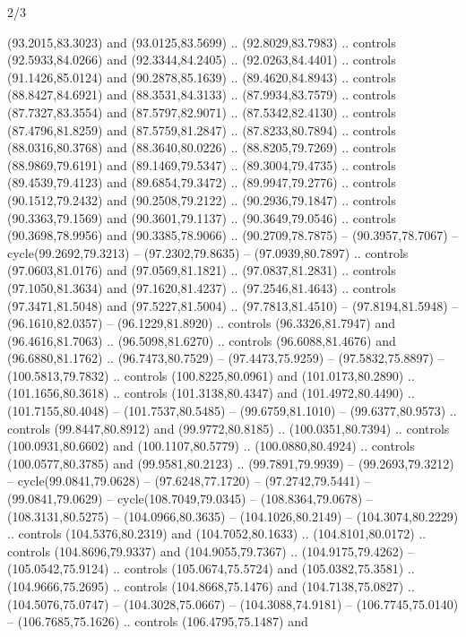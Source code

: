 \begin{flagdescription}{2/3}
\begin{scope}[scale=0.00214\flagwidth,yshift=164.5mm]
\begin{scope}[y=-0.8pt, x=0.8pt, inner sep=0pt, outer sep=0pt]
\begin{scope}[fill=black]
  (93.2015,83.3023) and (93.0125,83.5699) .. (92.8029,83.7983) .. controls
  (92.5933,84.0266) and (92.3344,84.2405) .. (92.0263,84.4401) .. controls
  (91.1426,85.0124) and (90.2878,85.1639) .. (89.4620,84.8943) .. controls
  (88.8427,84.6921) and (88.3531,84.3133) .. (87.9934,83.7579) .. controls
  (87.7327,83.3554) and (87.5797,82.9071) .. (87.5342,82.4130) .. controls
  (87.4796,81.8259) and (87.5759,81.2847) .. (87.8233,80.7894) .. controls
  (88.0316,80.3768) and (88.3640,80.0226) .. (88.8205,79.7269) .. controls
  (88.9869,79.6191) and (89.1469,79.5347) .. (89.3004,79.4735) .. controls
  (89.4539,79.4123) and (89.6854,79.3472) .. (89.9947,79.2776) .. controls
  (90.1512,79.2432) and (90.2508,79.2122) .. (90.2936,79.1847) .. controls
  (90.3363,79.1569) and (90.3601,79.1137) .. (90.3649,79.0546) .. controls
  (90.3698,78.9956) and (90.3385,78.9066) .. (90.2709,78.7875) --
  (90.3957,78.7067) -- cycle(99.2692,79.3213) -- (97.2302,79.8635) --
  (97.0939,80.7897) .. controls (97.0603,81.0176) and (97.0569,81.1821) ..
  (97.0837,81.2831) .. controls (97.1050,81.3634) and (97.1620,81.4237) ..
  (97.2546,81.4643) .. controls (97.3471,81.5048) and (97.5227,81.5004) ..
  (97.7813,81.4510) -- (97.8194,81.5948) -- (96.1610,82.0357) --
  (96.1229,81.8920) .. controls (96.3326,81.7947) and (96.4616,81.7063) ..
  (96.5098,81.6270) .. controls (96.6088,81.4676) and (96.6880,81.1762) ..
  (96.7473,80.7529) -- (97.4473,75.9259) -- (97.5832,75.8897) --
  (100.5813,79.7832) .. controls (100.8225,80.0961) and (101.0173,80.2890) ..
  (101.1656,80.3618) .. controls (101.3138,80.4347) and (101.4972,80.4490) ..
  (101.7155,80.4048) -- (101.7537,80.5485) -- (99.6759,81.1010) --
  (99.6377,80.9573) .. controls (99.8447,80.8912) and (99.9772,80.8185) ..
  (100.0351,80.7394) .. controls (100.0931,80.6602) and (100.1107,80.5779) ..
  (100.0880,80.4924) .. controls (100.0577,80.3785) and (99.9581,80.2123) ..
  (99.7891,79.9939) -- (99.2693,79.3212) -- cycle(99.0841,79.0628) --
  (97.6248,77.1720) -- (97.2742,79.5441) -- (99.0841,79.0629) --
  cycle(108.7049,79.0345) -- (108.8364,79.0678) -- (108.3131,80.5275) --
  (104.0966,80.3635) -- (104.1026,80.2149) -- (104.3074,80.2229) .. controls
  (104.5376,80.2319) and (104.7052,80.1633) .. (104.8101,80.0172) .. controls
  (104.8696,79.9337) and (104.9055,79.7367) .. (104.9175,79.4262) --
  (105.0542,75.9124) .. controls (105.0674,75.5724) and (105.0382,75.3581) ..
  (104.9666,75.2695) .. controls (104.8668,75.1476) and (104.7138,75.0827) ..
  (104.5076,75.0747) -- (104.3028,75.0667) -- (104.3088,74.9181) --
  (106.7745,75.0140) -- (106.7685,75.1626) .. controls (106.4795,75.1487) and

\end{scope}
\end{scope}
\end{scope}
\end{flagdescription}
